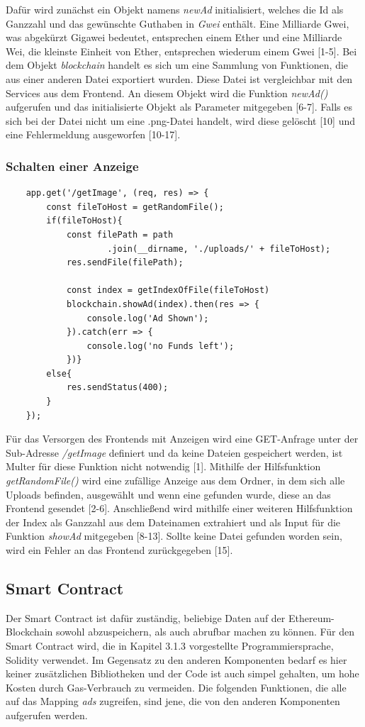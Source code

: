 Dafür wird zunächst ein Objekt namens \emph{newAd} initialisiert, welches die Id als Ganzzahl und das gewünschte Guthaben in \emph{Gwei} enthält. 
Eine Milliarde Gwei, was abgekürzt Gigawei bedeutet, entsprechen einem Ether und eine Milliarde Wei, die kleinste Einheit von Ether, entsprechen wiederum einem Gwei [1-5]. 
Bei dem Objekt \emph{blockchain} handelt es sich um eine Sammlung von Funktionen, die aus einer anderen Datei exportiert wurden. Diese Datei ist vergleichbar mit den Services aus dem Frontend. An diesem Objekt wird die Funktion \emph{newAd()} aufgerufen und das initialisierte Objekt als Parameter mitgegeben [6-7].
Falls es sich bei der Datei nicht um eine .png-Datei handelt, wird diese gelöscht [10] und eine Fehlermeldung ausgeworfen [10-17].
\subsubsection{Schalten einer Anzeige}
\begin{lstlisting}
	app.get('/getImage', (req, res) => {
		const fileToHost = getRandomFile();
		if(fileToHost){
			const filePath = path
					.join(__dirname, './uploads/' + fileToHost);
			res.sendFile(filePath);
			
			const index = getIndexOfFile(fileToHost)
			blockchain.showAd(index).then(res => {
				console.log('Ad Shown');
			}).catch(err => {
				console.log('no Funds left');
			})}
		else{
			res.sendStatus(400);
		}
	});
\end{lstlisting}
Für das Versorgen des Frontends mit Anzeigen wird eine GET-Anfrage unter der Sub-Adresse \emph{/getImage} definiert und da keine Dateien gespeichert werden, ist Multer für diese Funktion nicht notwendig [1]. Mithilfe der Hilfsfunktion \emph{getRandomFile()} wird eine zufällige Anzeige aus dem Ordner, in dem sich alle Uploads befinden, ausgewählt und wenn eine gefunden wurde, diese an das Frontend gesendet [2-6]. Anschließend wird mithilfe einer weiteren Hilfsfunktion der Index als Ganzzahl aus dem Dateinamen extrahiert und als Input für die Funktion \emph{showAd} mitgegeben [8-13]. Sollte keine Datei gefunden worden sein, wird ein Fehler an das Frontend zurückgegeben [15].
\subsection{Smart Contract}
Der Smart Contract ist dafür zuständig, beliebige Daten auf der Ethereum-Blockchain sowohl abzuspeichern, als auch abrufbar machen zu können.
Für den Smart Contract wird, die in Kapitel 3.1.3 vorgestellte Programmiersprache, Solidity verwendet. Im Gegensatz zu den anderen Komponenten bedarf es hier keiner zusätzlichen Bibliotheken und der Code ist auch simpel gehalten, um hohe Kosten durch Gas-Verbrauch zu vermeiden. Die folgenden Funktionen, die alle auf das Mapping \emph{ads} zugreifen, sind jene, die von den anderen Komponenten aufgerufen werden.
